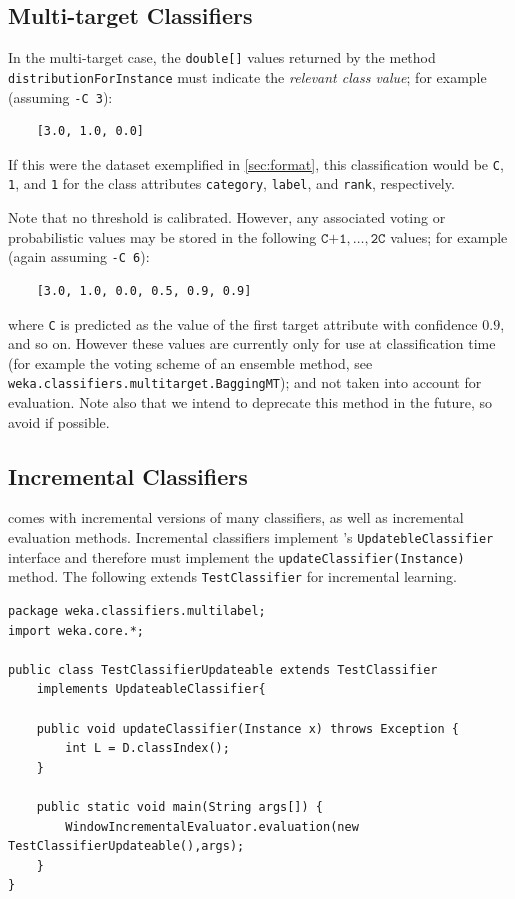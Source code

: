 \documentclass[11pt]{article}
\newcommand{\MEKA}{Meka}
\newcommand{\WEKA}{Weka}
\begin{document}
\subsection{Multi-target Classifiers}

In the multi-target case, the \texttt{double[]} values returned by the method \texttt{distributionForInstance} must indicate the \emph{relevant class value}; for example (assuming \texttt{-C 3}): 
\begin{verbatim}
	[3.0, 1.0, 0.0]
\end{verbatim} 
If this were the dataset exemplified in \ref{sec:format}, this classification would be \texttt{C}, \texttt{1}, and \texttt{1} for the class attributes \texttt{category}, \texttt{label}, and \texttt{rank}, respectively.

Note that no threshold is calibrated. However, any associated voting or probabilistic values may be stored in the following $\texttt{C+1},\ldots,\texttt{2C}$ values; for example (again assuming \texttt{-C 6}):
\begin{verbatim}
	[3.0, 1.0, 0.0, 0.5, 0.9, 0.9]
\end{verbatim} 
where \texttt{C} is predicted as the value of the first target attribute with confidence $0.9$, and so on. However these values are currently only for use at classification time (for example the voting scheme of an ensemble method, see \texttt{weka.classifiers.multitarget.BaggingMT}); and not taken into account for evaluation. Note also that we intend to deprecate this method in the future, so avoid if possible.

\subsection{Incremental Classifiers}

\framework{\MEKA} comes with incremental versions of many classifiers, as well as incremental evaluation methods. Incremental classifiers implement \framework{\WEKA}'s \texttt{UpdatebleClassifier} interface and therefore must implement the \texttt{updateClassifier(Instance)} method. The following extends \texttt{TestClassifier} for incremental learning.

{\small
\begin{verbatim}
package weka.classifiers.multilabel;
import weka.core.*;

public class TestClassifierUpdateable extends TestClassifier 
    implements UpdateableClassifier{
	
    public void updateClassifier(Instance x) throws Exception {
        int L = D.classIndex();
    }
    
    public static void main(String args[]) {
        WindowIncrementalEvaluator.evaluation(new TestClassifierUpdateable(),args);
    }
}
\end{verbatim}
}
\end{document}
